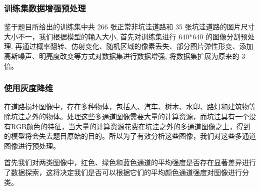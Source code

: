 \documentclass[a4paper, 10pt]{article}
\begin{document}
	\subsubsection{训练集数据增强预处理}
	
	鉴于题目所给出的训练集中共 266 张正常非坑洼道路和 35 张坑洼道路的图片尺寸大小不一，我们根据模型的输入大小, 首先对训练集进行 640*640 的图像分割预处理. 再通过概率翻转、仿射变化、随机区域的像素丢失、部分图片弹性形变、添加高斯噪声、明亮度改变等方式对数据集进行数据增强, 将数据集扩展为原来的 3 倍。
	
	\subsubsection{使用灰度降维}
	
	在道路损坏图像中，存在多种物体，包括人、汽车、树木、水印、路灯和建筑物等除坑洼之外的物体。处理这些多通道图像需要大量的计算资源，而坑洼具有一个没有RGB颜色的特征，当大量的计算资源花费在坑洼之外的多通道图像之上，得到的模型将会失去题目原始的目的。所以为了有效分析这些图像，我们对这些多通道图像进行预处理。
	
	首先我们对两类图像中，红色、绿色和蓝色通道的平均强度是否存在显著差异进行了数据探索，这将决定我们是否可以根据它们的平均颜色通道强度对图像进行分类。
	
\end{document}
